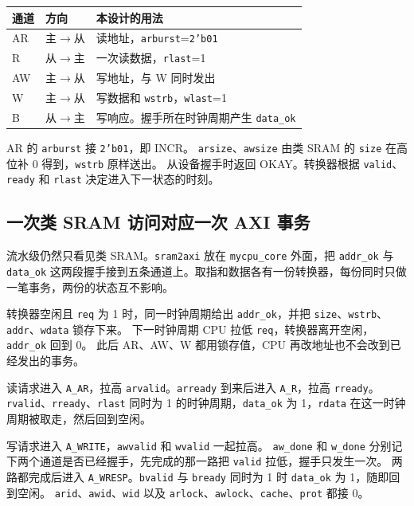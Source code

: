 \documentclass{article}
\begin{document}
\begin{center}
\small
\begin{tabular}{@{}llp{}@{}}
\toprule
通道 & 方向 & 本设计的用法 \\
\midrule
AR & 主$\to$从 & 读地址，\texttt{arburst}=\texttt{2'b01} \\
R & 从$\to$主 & 一次读数据，\texttt{rlast}=1 \\
AW & 主$\to$从 & 写地址，与 W 同时发出 \\
W & 主$\to$从 & 写数据和 \texttt{wstrb}，\texttt{wlast}=1 \\
B & 从$\to$主 & 写响应。握手所在时钟周期产生 \texttt{data\_ok} \\
\bottomrule
\end{tabular}
\end{center}

AR 的 \texttt{arburst} 接 \texttt{2'b01}，即 INCR。
\texttt{arsize}、\texttt{awsize} 由类 SRAM 的 \texttt{size} 在高位补 0 得到，\texttt{wstrb} 原样送出。
从设备握手时返回 OKAY。转换器根据 \texttt{valid}、\texttt{ready} 和 \texttt{rlast} 决定进入下一状态的时刻。

\subsection{一次类 SRAM 访问对应一次 AXI 事务}
流水级仍然只看见类 SRAM。\texttt{sram2axi} 放在 \texttt{mycpu\_core} 外面，把 \texttt{addr\_ok} 与 \texttt{data\_ok} 这两段握手接到五条通道上。取指和数据各有一份转换器，每份同时只做一笔事务，两份的状态互不影响。

转换器空闲且 \texttt{req} 为 1 时，同一时钟周期给出 \texttt{addr\_ok}，并把 \texttt{size}、\texttt{wstrb}、\texttt{addr}、\texttt{wdata} 锁存下来。
下一时钟周期 CPU 拉低 \texttt{req}，转换器离开空闲，\texttt{addr\_ok} 回到 0。
此后 AR、AW、W 都用锁存值，CPU 再改地址也不会改到已经发出的事务。

读请求进入 \texttt{A\_AR}，拉高 \texttt{arvalid}。\texttt{arready} 到来后进入 \texttt{A\_R}，拉高 \texttt{rready}。
\texttt{rvalid}、\texttt{rready}、\texttt{rlast} 同时为 1 的时钟周期，\texttt{data\_ok} 为 1，\texttt{rdata} 在这一时钟周期被取走，然后回到空闲。

写请求进入 \texttt{A\_WRITE}，\texttt{awvalid} 和 \texttt{wvalid} 一起拉高。
\texttt{aw\_done} 和 \texttt{w\_done} 分别记下两个通道是否已经握手，先完成的那一路把 \texttt{valid} 拉低，握手只发生一次。
两路都完成后进入 \texttt{A\_WRESP}。\texttt{bvalid} 与 \texttt{bready} 同时为 1 时 \texttt{data\_ok} 为 1，随即回到空闲。
\texttt{arid}、\texttt{awid}、\texttt{wid} 以及 \texttt{arlock}、\texttt{awlock}、\texttt{cache}、\texttt{prot} 都接 0。
\end{document}
